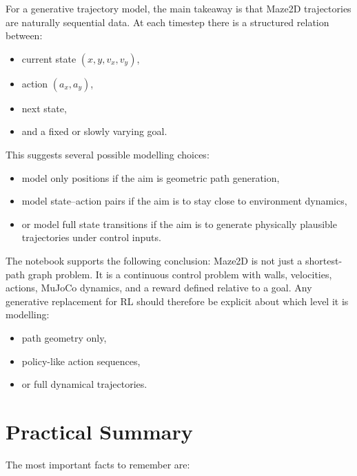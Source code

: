 \documentclass[12pt]{article}
\begin{document}
For a generative trajectory model, the main takeaway is that Maze2D trajectories are naturally sequential data. At each timestep there is a structured relation between:

\begin{itemize}[leftmargin=*]
\item current state \((x,y,v_x,v_y)\),
\item action \((a_x,a_y)\),
\item next state,
\item and a fixed or slowly varying goal.
\end{itemize}

This suggests several possible modelling choices:

\begin{itemize}[leftmargin=*]
\item model only positions if the aim is geometric path generation,
\item model state--action pairs if the aim is to stay close to environment dynamics,
\item or model full state transitions if the aim is to generate physically plausible trajectories under control inputs.
\end{itemize}

The notebook supports the following conclusion: Maze2D is not just a shortest-path graph problem. It is a continuous control problem with walls, velocities, actions, MuJoCo dynamics, and a reward defined relative to a goal. Any generative replacement for RL should therefore be explicit about which level it is modelling:

\begin{itemize}[leftmargin=*]
\item path geometry only,
\item policy-like action sequences,
\item or full dynamical trajectories.
\end{itemize}

\section*{Practical Summary}

The most important facts to remember are:
\end{document}
